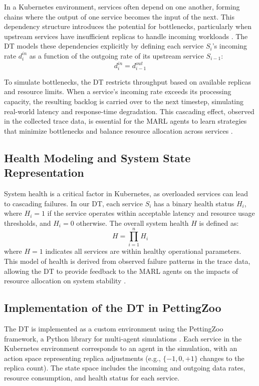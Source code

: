 \documentclass[conference]{IEEEtran}
\begin{document}
In a Kubernetes environment, services often depend on one another, forming chains where the output of one service becomes the input of the next. This dependency structure introduces the potential for bottlenecks, particularly when upstream services have insufficient replicas to handle incoming workloads \cite{zhang_marl_k8s}. The DT models these dependencies explicitly by defining each service $S_i$'s incoming rate $d_i^{in}$ as a function of the outgoing rate of its upstream service $S_{i-1}$:
\begin{equation}
    d_i^{in} = d_{i-1}^{out}
\end{equation}

To simulate bottlenecks, the DT restricts throughput based on available replicas and resource limits. When a service’s incoming rate exceeds its processing capacity, the resulting backlog is carried over to the next timestep, simulating real-world latency and response-time degradation. This cascading effect, observed in the collected trace data, is essential for the MARL agents to learn strategies that minimize bottlenecks and balance resource allocation across services \cite{rosenberg_k8s_autoscaling}.

\subsection{Health Modeling and System State Representation}

System health is a critical factor in Kubernetes, as overloaded services can lead to cascading failures. In our DT, each service $S_i$ has a binary health status $H_i$, where $H_i = 1$ if the service operates within acceptable latency and resource usage thresholds, and $H_i = 0$ otherwise. The overall system health $H$ is defined as:
\begin{equation}
    H = \prod_{i=1}^{n} H_i
\end{equation}
where $H = 1$ indicates all services are within healthy operational parameters. This model of health is derived from observed failure patterns in the trace data, allowing the DT to provide feedback to the MARL agents on the impacts of resource allocation on system stability \cite{schwartz_drl_cloud}.

\subsection{Implementation of the DT in PettingZoo}

The DT is implemented as a custom environment using the PettingZoo framework, a Python library for multi-agent simulations \cite{pettingzoo_framework}. Each service in the Kubernetes environment corresponds to an agent in the simulation, with an action space representing replica adjustments (e.g., $\{-1, 0, +1\}$ changes to the replica count). The state space includes the incoming and outgoing data rates, resource consumption, and health status for each service.
\end{document}
